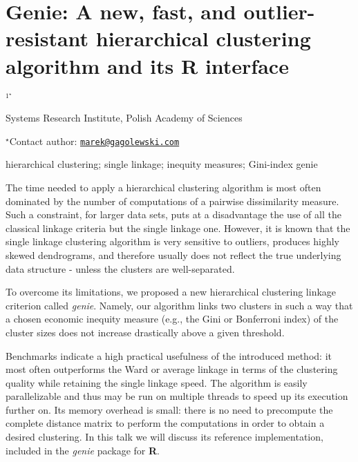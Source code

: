 \documentclass[\main/boa.tex]{subfiles}
\begin{document}
\section{Genie: A new, fast, and outlier-resistant hierarchical clustering
algorithm and its R interface}

\begin{center}
  {\bf {}$^{1^\star}$}
\end{center}

\vskip 0.3cm

\begin{affiliations}
\begin{enumerate}
\begin{minipage}{0.915\textwidth}
\centering
\item Systems Research Institute, Polish Academy of Sciences \\[-2pt]
\end{minipage}
\end{enumerate}
$^\star$Contact author: \href{mailto:marek@gagolewski.com}{\nolinkurl{marek@gagolewski.com}}\\
\end{affiliations}

\vskip 0.5cm

\begin{minipage}{0.915\textwidth}
\keywords hierarchical clustering; single linkage; inequity measures; Gini-index
\packages genie
\end{minipage}

\vskip 0.8cm

The time needed to apply a hierarchical clustering algorithm is most
often dominated by the number of computations of a pairwise
dissimilarity measure. Such a constraint, for larger data sets, puts at
a disadvantage the use of all the classical linkage criteria but the
single linkage one. However, it is known that the single linkage
clustering algorithm is very sensitive to outliers, produces highly
skewed dendrograms, and therefore usually does not reflect the true
underlying data structure - unless the clusters are well-separated.

To overcome its limitations, we proposed a new hierarchical clustering
linkage criterion called \emph{genie}. Namely, our algorithm links two
clusters in such a way that a chosen economic inequity measure (e.g.,
the Gini or Bonferroni index) of the cluster sizes does not increase
drastically above a given threshold.

Benchmarks indicate a high practical usefulness of the introduced
method: it most often outperforms the Ward or average linkage in terms
of the clustering quality while retaining the single linkage speed. The
algorithm is easily parallelizable and thus may be run on multiple
threads to speed up its execution further on. Its memory overhead is
small: there is no need to precompute the complete distance matrix to
perform the computations in order to obtain a desired clustering. In
this talk we will discuss its reference implementation, included in the
\emph{genie} package for \textbf{R}.
\end{document}
